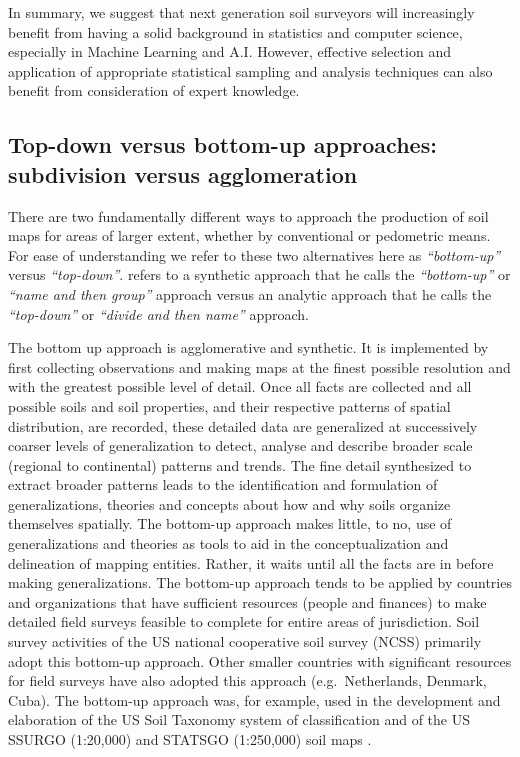 \documentclass[graybox,natbib,nospthms,UStrade]{svmono}
\begin{document}
In summary, we suggest that next generation soil surveyors will
increasingly benefit from having a solid background in statistics and computer
science, especially in Machine Learning and A.I. However, effective selection and application of
appropriate statistical sampling and analysis techniques can also benefit from
consideration of expert knowledge.

\hypertarget{top-down}{%
\subsection{Top-down versus bottom-up approaches: subdivision versus agglomeration}\label{top-down}}

There are two fundamentally different ways to approach the production of
soil maps for areas of larger extent, whether by conventional or
pedometric means. For ease of understanding we refer to these two
alternatives here as \emph{``bottom-up''} versus \emph{``top-down''}. \citet{Rossiter2001}
refers to a synthetic approach that he calls the \emph{``bottom-up''} or \emph{``name
and then group''} approach versus an analytic approach that he calls the
\emph{``top-down''} or \emph{``divide and then name''} approach.

The bottom up approach is agglomerative and synthetic. It is implemented
by first collecting observations and making maps at the finest possible
resolution and with the greatest possible level of detail. Once all
facts are collected and all possible soils and soil properties, and
their respective patterns of spatial distribution, are recorded, these
detailed data are generalized at successively coarser levels of
generalization to detect, analyse and describe broader scale (regional
to continental) patterns and trends. The fine detail synthesized to
extract broader patterns leads to the identification and formulation of
generalizations, theories and concepts about how and why soils organize
themselves spatially. The bottom-up approach makes little, to no, use of
generalizations and theories as tools to aid in the conceptualization
and delineation of mapping entities. Rather, it waits until all the
facts are in before making generalizations. The bottom-up approach tends
to be applied by countries and organizations that have sufficient
resources (people and finances) to make detailed field surveys feasible
to complete for entire areas of jurisdiction. Soil survey activities of
the US national cooperative soil survey (NCSS) primarily adopt this
bottom-up approach. Other smaller countries with significant resources
for field surveys have also adopted this approach (e.g.~Netherlands,
Denmark, Cuba). The bottom-up approach was, for example, used in the
development and elaboration of the US Soil Taxonomy system of
classification and of the US SSURGO (1:20,000) and STATSGO (1:250,000)
soil maps \citep{ZHONG2011491}.
\end{document}

